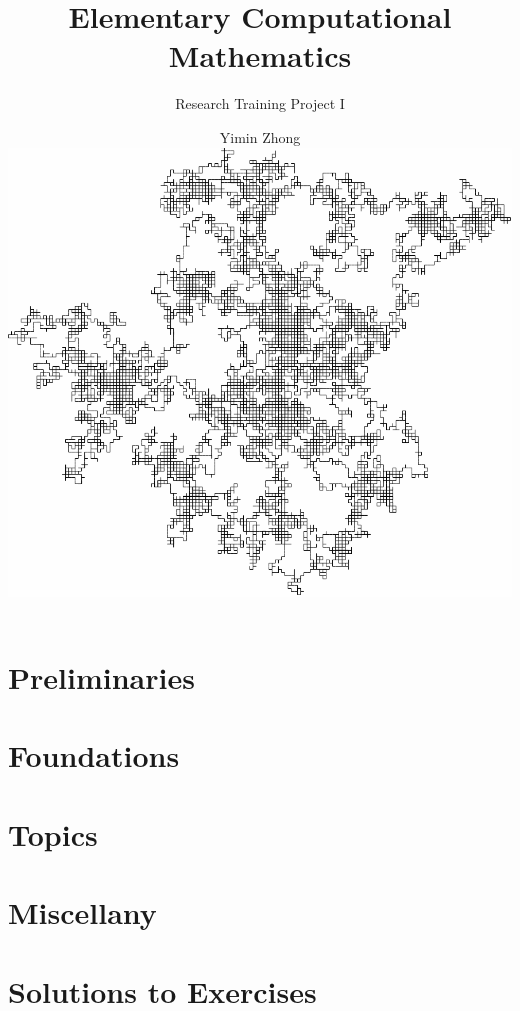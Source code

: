 \documentclass[11pt,a4paper]{book}
\title{Elementary Computational Mathematics}
\subtitle{Research Training Project I}
\author{Yimin Zhong\\\vspace{0.5cm}
\includegraphics[scale=0.3]{Figures/randomwalk-0.png}}
\date{}
\affil{\vspace{1cm}Department of Mathematics and Statistics,\\Auburn University}
\begin{document}
\maketitle
\frontmatter

\tableofcontents
\mainmatter
\part{Preliminaries}










\part{Foundations}


\part{Topics}

\part{Miscellany}

\part{Solutions to Exercises}

\end{document}
